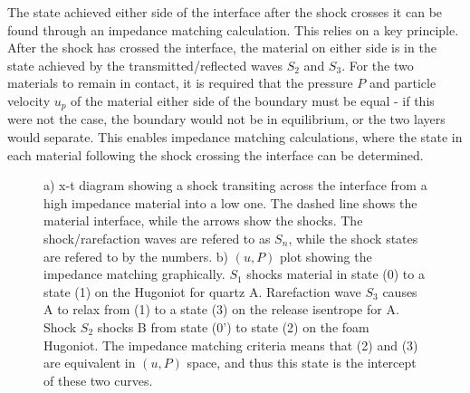 The state achieved either side of the interface after the shock crosses it can be found through an impedance matching calculation. This relies on a key principle. After the shock has crossed the interface, the material on either side is in the state achieved by the transmitted/reflected waves $S_2$ and $S_3$. For the two materials to remain in contact, it is required that the pressure $P$ and particle velocity $u_p$ of the material either side of the boundary must be equal - if this were not the case, the boundary would not be in equilibrium, or the two layers would separate. This enables impedance matching calculations, where the state in each material following the shock crossing the interface can be determined.

\begin{figure}
\centering     %
{}
\caption{ \label{fig:ShockDiagramAndIMTheory1} a) x-t diagram showing a shock transiting across the interface from a high impedance material into a low one. The dashed line shows the material interface, while the arrows show the shocks. The shock/rarefaction waves are refered to as $S_n$, while the shock states are refered to by the numbers. b) $(u, P)$ plot showing the impedance matching graphically. $S_1$ shocks material in state (0) to a state (1) on the Hugoniot for quartz A. Rarefaction wave $S_3$ causes A to relax from (1) to a state (3) on the release isentrope for A. Shock $S_2$ shocks B from state (0') to state (2) on the foam Hugoniot. The impedance matching criteria means that (2) and (3) are equivalent in $(u, P)$ space, and thus this state is the intercept of these two curves.}
\end{figure}

